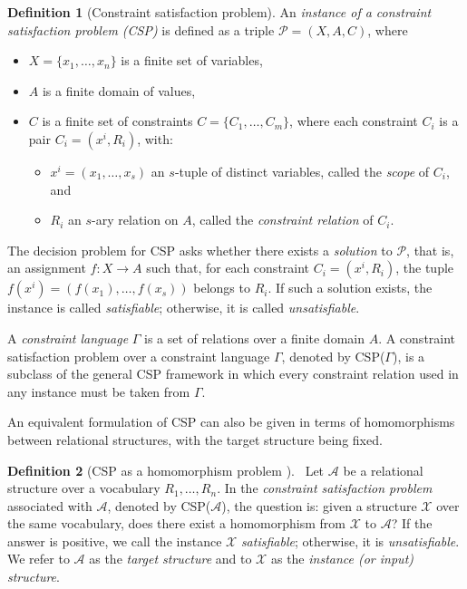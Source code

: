 \documentclass{article}
\theoremstyle{definition}
\newtheorem{df}{Definition}
\theoremstyle{theorem}
\theoremstyle{theorem}
\theoremstyle{remark}
\theoremstyle{remark}
\theoremstyle{example}
\theoremstyle{notation}
\theoremstyle{theorem}
\begin{document}
\begin{df}[Constraint satisfaction problem]
     An \emph{instance of a constraint satisfaction problem (CSP)} \color{black} is defined as a triple $\mathcal{P} = (X,A,C)$, where
\begin{itemize}
    \item $X = \{x_1,\ldots,x_{n}\}$ is a finite set of variables,
    \item $A$ is a finite domain of values,
    \item $C$ is a finite set of constraints $C=\{C_1,\ldots,C_m\}$, where each constraint $C_i$ is a pair $C_i = (x^i, R_i)$, with:
\begin{itemize}
\item $x^i = (x_1, \ldots, x_s)$ an $s$-tuple of distinct variables, called the \emph{scope} of $C_i$, and
\item $R_i$ an $s$-ary relation on $A$, called the \emph{constraint relation} of $C_i$.
\end{itemize} 
\end{itemize}
The decision problem for CSP asks whether there exists a \emph{solution} to $\mathcal{P}$, that is, an assignment $f:X\rightarrow A$ such that, for each constraint $C_i=(x^i,R_i)$, the tuple $f(x^i)=(f(x_1),\ldots,f(x_s))$ belongs to $R_i$. If such a solution exists, the instance is called \emph{satisfiable}; otherwise, it is called \emph{unsatisfiable}.
\end{df}

A \emph{constraint language} $\Gamma$ is a set of relations over a finite domain $A$. A constraint satisfaction problem over a constraint language $\Gamma$, denoted by CSP($\Gamma$), is a subclass of the general CSP framework in which every constraint relation used in any instance must be taken from $\Gamma$.

An equivalent formulation of CSP can also be given in terms of homomorphisms between relational structures, with the target structure being fixed.

\begin{df}
    [CSP as a homomorphism problem \cite{BULATOV200531}] $\,$
Let $\mathcal{A}$ be a relational structure over a vocabulary $R_1, \ldots, R_n$. In the \emph{constraint satisfaction problem} associated with $\mathcal{A}$, denoted by CSP($\mathcal{A}$), the question is: given a structure $\mathcal{X}$ over the same vocabulary, does there exist a homomorphism from $\mathcal{X}$ to $\mathcal{A}$? If the answer is positive, we call the instance $\mathcal{X}$ \emph{satisfiable}; otherwise, it is \emph{unsatisfiable}. We refer to $\mathcal{A}$ as the \emph{target structure} and to $\mathcal{X}$ as the \emph{instance (or input) structure}.
\end{df}
\end{document}
